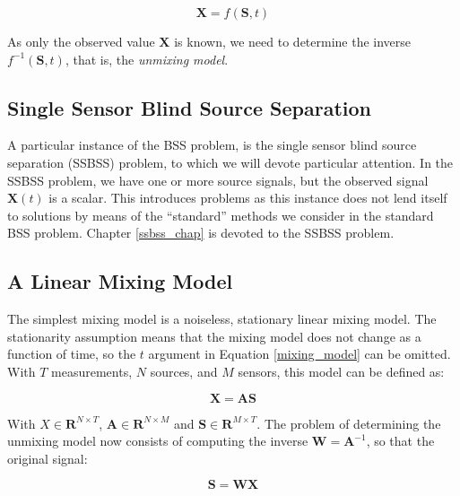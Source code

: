 \documentclass[11pt, oneside, a4paper]{report}
\begin{document}
\begin{equation}\label{mixing_model}
  \boldsymbol{X} = f(\boldsymbol{S},t)
\end{equation}

As only the observed value $\boldsymbol{X}$ is known, we need to
determine the inverse $f^{-1}(\boldsymbol{S},t)$, that is, the
\emph{unmixing model}.


\subsection{Single Sensor Blind Source Separation}

A particular instance of the BSS problem, is the single sensor blind
source separation (SSBSS) problem, to which we will devote particular
attention. In the SSBSS problem, we have one or more source signals,
but the observed signal $\boldsymbol{X}(t)$ is a scalar. This
introduces problems as this instance does not lend itself to solutions
by means of the ``standard'' methods we consider in the standard BSS
problem. Chapter \ref{ssbss_chap} is devoted to the SSBSS problem.


\subsection{A Linear Mixing Model}

The simplest mixing model is a noiseless, stationary linear mixing
model. The stationarity assumption means that the mixing model does
not change as a function of time, so the $t$ argument in Equation
\ref{mixing_model} can be omitted. With $T$ measurements, $N$ sources,
and $M$ sensors, this model can be defined as:



\begin{equation}\label{linear_mixing_model}
 \boldsymbol{X} = \boldsymbol{A}\boldsymbol{S}
\end{equation}

With $\boldsymbol{}X \in \mathbf{R}^{N\times T}$, $\boldsymbol{A} \in \mathbf{R}^{N\times M}$
and $\boldsymbol{S} \in \mathbf{R}^{M\times T}$. The problem of determining the
unmixing model now consists of computing the inverse $\boldsymbol{W} = \boldsymbol{A}^{-1}$, so
that the original signal:

\begin{equation}\label{linear_unmixing_model}
\boldsymbol{S} = \boldsymbol{W}\boldsymbol{X}
\end{equation}
\end{document}
